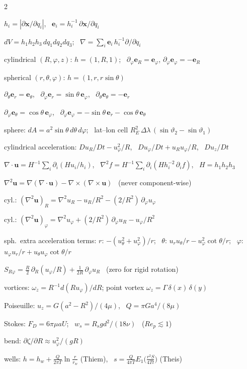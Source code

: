 \documentclass[11pt,letterpaper]{article}
\numberwithin{equation}{section}
\newcommand{\uu}{\mathbf{u}}
\newcommand{\xx}{\mathbf{x}}
\newcommand{\e}[1]{\mathbf{e}_{#1}}
\begin{document}
\begin{multicols}{2}
\begin{fsl}
  \item $h_i=|\partial\xx/\partial q_i|$, \ $\e{i}=h_i^{-1}\,\partial\xx/\partial q_i$
  \item $dV=h_1h_2h_3\,dq_1dq_2dq_3$; \ $\nabla=\sum_i\e{i}\,h_i^{-1}\partial/\partial q_i$
  \item cylindrical $(R,\varphi,z)$: $h=(1,R,1)$; \ $\partial_\varphi\e{R}=\e{\varphi}$, $\partial_\varphi\e{\varphi}=-\e{R}$
  \item spherical $(r,\theta,\varphi)$: $h=(1,r,r\sin\theta)$
  \item $\partial_\theta\e{r}=\e{\theta}$, \ $\partial_\varphi\e{r}=\sin\theta\,\e{\varphi}$, \ $\partial_\theta\e{\theta}=-\e{r}$
  \item $\partial_\varphi\e{\theta}=\cos\theta\,\e{\varphi}$, \ $\partial_\varphi\e{\varphi}=-\sin\theta\,\e{r}-\cos\theta\,\e{\theta}$
  \item sphere: $dA=a^2\sin\theta\,d\theta\,d\varphi$; \ lat--lon cell $R_E^2\,\Delta\lambda\,(\sin\vartheta_2-\sin\vartheta_1)$
  \item cylindrical acceleration: $Du_R/Dt-u_\varphi^2/R$, \ $Du_\varphi/Dt+u_Ru_\varphi/R$, \ $Du_z/Dt$
\end{fsl}

\begin{fsl}
  \item $\nabla\cdot\uu=H^{-1}\sum_i\partial_i(Hu_i/h_i)$, \ $\nabla^2f=H^{-1}\sum_i\partial_i(Hh_i^{-2}\,\partial_if)$, \ $H=h_1h_2h_3$
  \item $\nabla^2\uu=\nabla(\nabla\cdot\uu)-\nabla\times(\nabla\times\uu)$ \ (never component-wise)
  \item cyl.: $(\nabla^2\uu)_R=\nabla^2u_R-u_R/R^2-(2/R^2)\,\partial_\varphi u_\varphi$
  \item cyl.: $(\nabla^2\uu)_\varphi=\nabla^2u_\varphi+(2/R^2)\,\partial_\varphi u_R-u_\varphi/R^2$
  \item sph.\ extra acceleration terms: $r$: $-(u_\theta^2+u_\varphi^2)/r$; \ $\theta$: $u_ru_\theta/r-u_\varphi^2\cot\theta/r$; \
        $\varphi$: $u_\varphi u_r/r+u_\theta u_\varphi\cot\theta/r$
  \item $S_{R\varphi}=\frac R2\,\partial_R(u_\varphi/R)+\frac{1}{2R}\,\partial_\varphi u_R$ \ (zero for rigid rotation)
  \item vortices: $\omega_z=R^{-1}d(Ru_\varphi)/dR$; point vortex $\omega_z=\Gamma\,\delta(x)\,\delta(y)$
  \item Poiseuille: $u_z=G(a^2-R^2)/(4\mu)$, \ $Q=\pi Ga^4/(8\mu)$
  \item Stokes: $F_D=6\pi\mu aU$; \ $w_s=R_sgd^2/(18\nu)$ \ ($Re_p\lesssim1$)
  \item bend: $\partial\zeta/\partial R\approx u_\varphi^2/(gR)$
  \item wells: $h=h_w+\frac{Q}{2\pi T}\ln\frac{r}{r_w}$ (Thiem), \ $s=\frac{Q}{4\pi T}E_1\!\big(\frac{r^2S}{4Tt}\big)$ (Theis)
\end{fsl}
\end{multicols}
\end{document}
